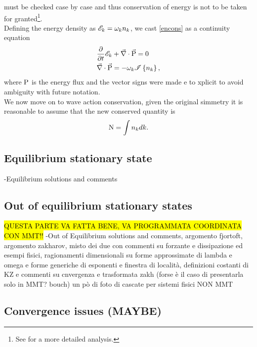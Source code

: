 must be checked case by case and thus conservation of energy is not to be taken for granted\footnote{See \cite{Zakharov} for a more detailed analysis.}. \\
Defining the energy density as $\mathscr{E}_k = \omega_k n_k$, we cast \eqref{encons} as a continuity equation
\begin{align}
    &\frac{\partial}{\partial t} \mathscr{E}_k + \vec{\nabla}\cdot\vec{\mathrm{P}} = 0 \label{Econtinuity}\\
    &\vec{\nabla}\cdot\vec{\mathrm{P}} = -\omega_k \mathscr{I}\left\{n_k\right\}, 
\end{align}
where $\mathrm{P}$ is the energy flux and the vector signs were made e to xplicit to avoid ambiguity with future notation. \\

We now move on to wave action conservation, given the original simmetry it is reasonable to assume that the new conserved quantity is 
\begin{equation}
    \mathrm{N} = \int n_k dk.
\end{equation}
 
\subsection{Equilibrium stationary state}

-Equilibrium solutions and comments 

\subsection{Out of equilibrium stationary states}
\hl{QUESTA PARTE VA FATTA BENE, VA PROGRAMMATA COORDINATA CON MMT!!}
-Out of Equilibrium solutions and comments, argomento fjortoft, argomento zakharov, misto dei due con commenti su forzante e dissipazione 
ed esempi fisici, ragionamenti dimensionali su forme approssimate di lambda e omega e forme generiche di esponenti e finestra di località, definizioni costanti di KZ e commenti su cnvergenza e 
trasformata zakh (forse è il caso di presentarla solo in MMT? bouch) un pò di foto di cascate per sistemi fisici NON MMT

\subsection{Convergence issues (MAYBE)}